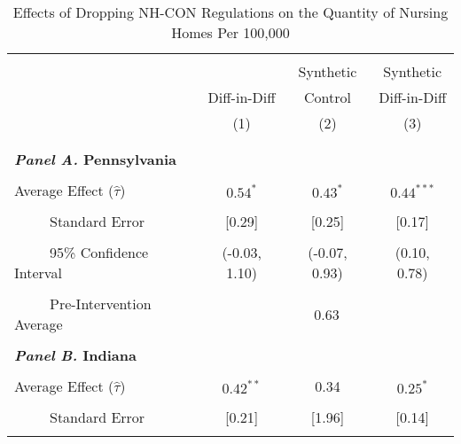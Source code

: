 \documentclass[../Main.tex]{subfiles}
\begin{document}
\newpage
\null
\vfill
\begin{table}[htbp]\centering \footnotesize
\def\sym#1{\ifmmode^{#1}\else\(^{#1}\)\fi}
\captionsetup{width=.69\textwidth}
\caption{\centering Effects of Dropping NH-CON Regulations on the Quantity of Nursing Homes Per 100,000}
\label{tab:ave_results_q_nh}
\setlength{\tabcolsep}{10pt}
\begin{tabular}{l*{3}{c}}
\hline\hline
\\[-2ex]
&\multicolumn{1}{c}{}&\multicolumn{1}{c}{Synthetic}&\multicolumn{1}{c}{Synthetic}\\
&\multicolumn{1}{c}{Diff-in-Diff}&\multicolumn{1}{c}{Control}&\multicolumn{1}{c}{Diff-in-Diff}\\
&\multicolumn{1}{c}{(1)}&\multicolumn{1}{c}{(2)}&\multicolumn{1}{c}{(3)}\\
\\[-2ex]
\hline
\\[-.1ex]
\multicolumn{4}{l}{\textbf{\textit{Panel A.} Pennsylvania}}\\
\\[-1.5ex]
\multicolumn{1}{l}{Average Effect ($\hat{\tau}$)}&   \multicolumn{1}{c}{$0.54^{*}$}&   \multicolumn{1}{c}{$0.43^{*}$}&  \multicolumn{1}{c}{$0.44^{***}$}\\
\\[-2ex]
\multicolumn{1}{l}{\ \ \ \ \ Standard Error}  &\multicolumn{1}{c}{[0.29]}&\multicolumn{1}{c}{[0.25]}&\multicolumn{1}{c}{[0.17]}\\
\\[-2ex]
\multicolumn{1}{l}{\ \ \ \ \ 95\% Confidence Interval}&   \multicolumn{1}{c}{(-0.03, 1.10)}&   \multicolumn{1}{c}{(-0.07, 0.93)}&   \multicolumn{1}{c}{(0.10, 0.78)}\\
\\[-2ex]
\multicolumn{1}{l}{\ \ \ \ \ Pre-Intervention Average}&   \multicolumn{3}{c}{0.63}\\
\\[-.1ex]
\multicolumn{4}{l}{\textbf{\textit{Panel B.} Indiana}}\\
\\[-1.5ex]
\multicolumn{1}{l}{Average Effect ($\hat{\tau}$)}&   \multicolumn{1}{c}{$0.42^{**}$}&   \multicolumn{1}{c}{0.34}&  \multicolumn{1}{c}{$0.25^{*}$}\\
\\[-2ex]
\multicolumn{1}{l}{\ \ \ \ \ Standard Error}  &\multicolumn{1}{c}{[0.21]}&\multicolumn{1}{c}{[1.96]}&\multicolumn{1}{c}{[0.14]}\\
\\[-2ex]

\end{tabular}
\end{table}
\end{document}
